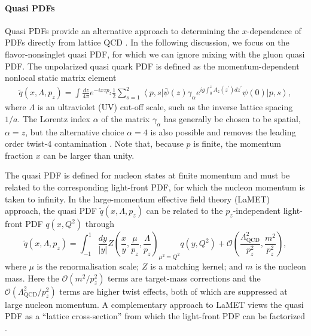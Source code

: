 %

\paragraph{Quasi PDFs}
Quasi PDFs provide an alternative approach to determining the $x$-dependence of PDFs directly from lattice QCD \cite{Ji:2013dva,Ji:2014gla}. In the following discussion, we focus on the flavor-nonsinglet quasi PDF, for which we can ignore mixing with the gluon quasi PDF. The unpolarized quasi quark PDF is defined as the momentum-dependent
nonlocal static matrix element
\begin{align}\label{eq:qPDF}
\widetilde{q}(x,\Lambda,p_z)  = \int \frac{dz}{4\pi} e^{-i x z p_z} 
\frac{1}{2}\sum_{s=1}^2\left\langle p,s\right\vert \bar{\psi}(z)\gamma_\alpha e^{ig\int_0^z
A_z(z^\prime) dz^\prime} \psi(0) \left\vert p,s\right\rangle ,
\end{align}
where $\Lambda$ is an ultraviolet (UV) cut-off scale, such as the inverse lattice spacing $1/a$. The Lorentz index $\alpha$ of the matrix $\gamma_\alpha$ has generally be chosen to be spatial, $\alpha = z$, but the alternative choice $\alpha = 4$ is also possible and removes the leading order twist-4 contamination \cite{Radyushkin:2016hsy}. Note that, because $p$ is finite, the momentum fraction $x$ can be larger than unity.

The quasi PDF is defined for nucleon states at finite momentum and must be related to the corresponding light-front PDF, for which the nucleon momentum is taken to infinity.
In the  large-momentum  effective field theory (LaMET) approach, the quasi PDF $\widetilde{q}(x,\Lambda,p_z)$ can be related to the $p_z$-independent
light-front PDF $q(x,Q^2)$ through~\cite{Ji:2013dva,Ji:2014gla}
\begin{equation} \label{eq:qPDFmatching}
\widetilde{q}(x,\Lambda ,p_z) = 
  \int_{-1}^1 \frac{dy}{\left\vert y\right\vert} 
    Z\left( \frac{x}{y}, \frac{\mu}{p_z}, \frac{\Lambda}{p_z}\right)_{\mu^2 = Q^2} q(y,Q^2) +
  \mathcal{O}\left( \frac{\Lambda_\text{QCD}^2}{p_z^2},\frac{m^2}{p_z^2}\right), 
\end{equation}
where $\mu$ is the renormalisation scale;
$Z$ is a matching kernel; and $m$ is the nucleon mass.
Here the $\mathcal{O}\left(m^2/p_z^2\right)$ terms are target-mass corrections and the $ \mathcal{O}\left(\Lambda_\text{QCD}^2/p_z^2\right)$ terms are higher twist effects, both of which are suppressed at large nucleon momentum. A complementary approach to LaMET views the quasi PDF as a ``lattice cross-section'' from which the light-front PDF can be factorized \cite{Ma:2014jla, Ma:2014jga}. 

